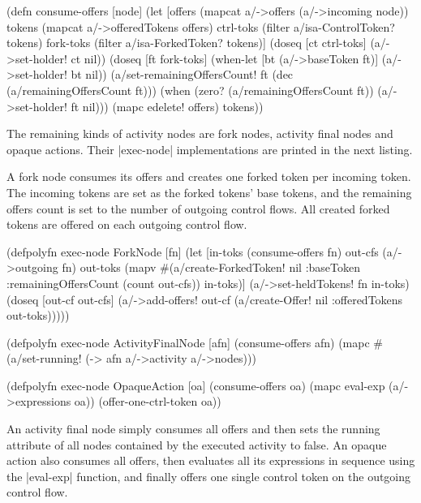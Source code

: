 \documentclass[submission]{eptcs}
\newcommand{\code}{\clojureinline}
\begin{document}
\begin{clojurecode}
(defn consume-offers [node]
  (let [offers    (mapcat a/->offers (a/->incoming node))
        tokens    (mapcat a/->offeredTokens offers)
        ctrl-toks (filter a/isa-ControlToken? tokens)
        fork-toks (filter a/isa-ForkedToken? tokens)]
    (doseq [ct ctrl-toks]
      (a/->set-holder! ct nil))
    (doseq [ft fork-toks]
      (when-let [bt (a/->baseToken ft)]
        (a/->set-holder! bt nil))
      (a/set-remainingOffersCount! ft (dec (a/remainingOffersCount ft)))
      (when (zero? (a/remainingOffersCount ft))
        (a/->set-holder! ft nil)))
    (mapc edelete! offers)
    tokens))
\end{clojurecode}

The remaining kinds of activity nodes are fork nodes, activity final nodes and
opaque actions.  Their \code|exec-node| implementations are printed in the next
listing.

A fork node consumes its offers and creates one forked token per incoming
token.  The incoming tokens are set as the forked tokens' base tokens, and the
remaining offers count is set to the number of outgoing control flows.  All
created forked tokens are offered on each outgoing control flow.

\begin{clojurecode}
(defpolyfn exec-node ForkNode [fn]
  (let [in-toks  (consume-offers fn)
        out-cfs  (a/->outgoing fn)
        out-toks (mapv #(a/create-ForkedToken!
                         nil {:baseToken %
                              :remainingOffersCount (count out-cfs)})
                       in-toks)]
    (a/->set-heldTokens! fn in-toks)
    (doseq [out-cf out-cfs]
      (a/->add-offers! out-cf (a/create-Offer!
                               nil {:offeredTokens out-toks})))))

(defpolyfn exec-node ActivityFinalNode [afn]
  (consume-offers afn)
  (mapc #(a/set-running! %
        (-> afn a/->activity a/->nodes)))

(defpolyfn exec-node OpaqueAction [oa]
  (consume-offers oa)
  (mapc eval-exp (a/->expressions oa))
  (offer-one-ctrl-token oa))
\end{clojurecode}

An activity final node simply consumes all offers and then sets the
\textsf{running} attribute of all nodes contained by the executed activity to
false.  An opaque action also consumes all offers, then evaluates all its
expressions in sequence using the \code|eval-exp| function, and finally offers
one single control token on the outgoing control flow.
\end{document}
